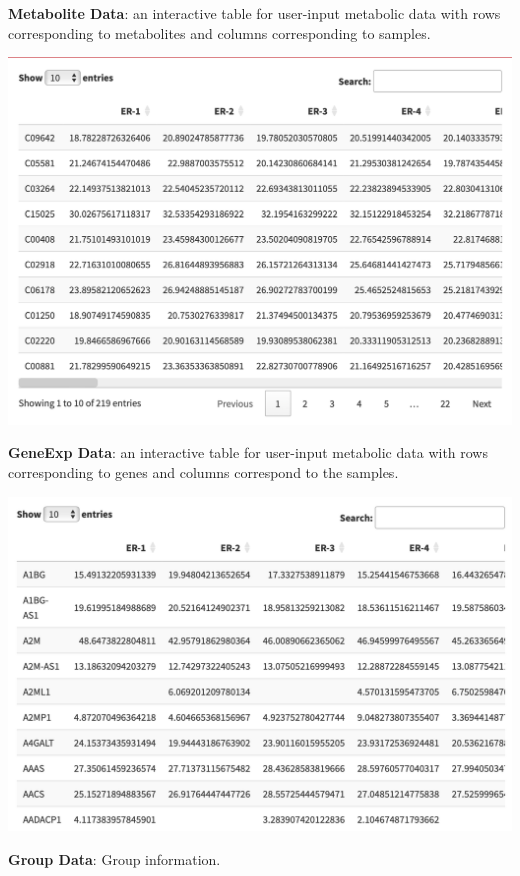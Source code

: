 \documentclass[
]{book}
\begin{document}
\textbf{Metabolite Data}: an interactive table for user-input metabolic data with rows corresponding to metabolites and columns corresponding to samples.

\includegraphics[width=22.64in]{figure/Metabolite}

\textbf{GeneExp Data}: an interactive table for user-input metabolic data with rows corresponding to genes and columns correspond to the samples.

\includegraphics[width=22.42in]{figure/GeneExp}

\textbf{Group Data}: Group information.
\end{document}

